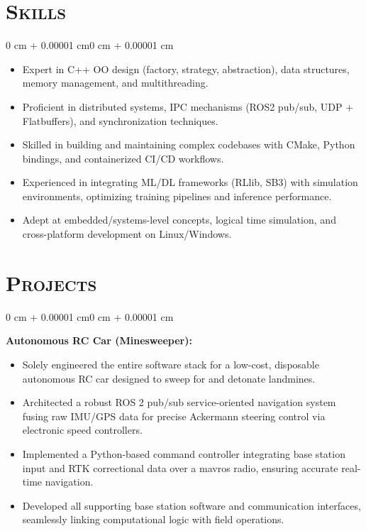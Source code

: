 \documentclass[11pt, letterpaper]{article}
\newenvironment{highlights}{
    \begin{itemize}[
        topsep=0.10 cm,
        parsep=0.10 cm,
        partopsep=0pt,
        itemsep=0pt,
        leftmargin=0.4 cm + 10pt
    ]
}{
    \end{itemize}
}
\newenvironment{onecolentry}{
    \begin{adjustwidth}{0 cm + 0.00001 cm}{0 cm + 0.00001 cm}
}{
    \end{adjustwidth}
}
\begin{document}
\section{\scshape Skills}

\begin{onecolentry}
    \begin{highlights}
        \item Expert in C++ OO design (factory, strategy, abstraction), data structures, memory management, and multithreading.
        \item Proficient in distributed systems, IPC mechanisms (ROS2 pub/sub, UDP + Flatbuffers), and synchronization techniques.
        \item Skilled in building and maintaining complex codebases with CMake, Python bindings, and containerized CI/CD workflows.
        \item Experienced in integrating ML/DL frameworks (RLlib, SB3) with simulation environments, optimizing training pipelines and inference performance.
        \item Adept at embedded/systems-level concepts, logical time simulation, and cross-platform development on Linux/Windows.
    \end{highlights}
\end{onecolentry}

\section{\scshape Projects}

\vspace{0.2 cm}

\begin{onecolentry}
    \textbf{Autonomous RC Car (Minesweeper):}
    \begin{highlights}
        \item Solely engineered the entire software stack for a low-cost, disposable autonomous RC car designed to sweep for and detonate landmines.
        \item Architected a robust ROS 2 pub/sub service-oriented navigation system fusing raw IMU/GPS data for precise Ackermann steering control via electronic speed controllers.
        \item Implemented a Python-based command controller integrating base station input and RTK correctional data over a mavros radio, ensuring accurate real-time navigation.
        \item Developed all supporting base station software and communication interfaces, seamlessly linking computational logic with field operations.
    \end{highlights}
\end{onecolentry}
\end{document}
